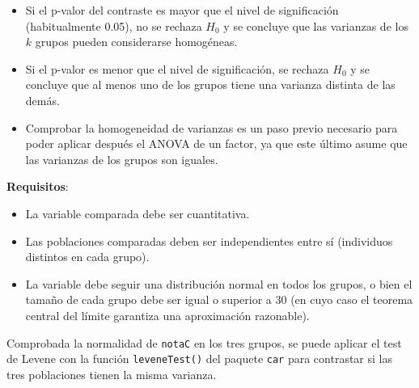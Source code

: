 \documentclass[
  spanish,
  a4paper,
]{scrreport}
\providecommand{\tightlist}{%
  \setlength{\itemsep}{0pt}\setlength{\parskip}{0pt}}
\theoremstyle{definition}
\theoremstyle{definition}
\theoremstyle{remark}
\begin{document}
\begin{tcolorbox}[enhanced jigsaw, arc=.35mm, bottomrule=.15mm, bottomtitle=1mm, breakable, colback=white, colbacktitle=quarto-callout-note-color!10!white, colframe=quarto-callout-note-color-frame, coltitle=black, left=2mm, leftrule=.75mm, opacityback=0, opacitybacktitle=0.6, rightrule=.15mm, title=\textcolor{quarto-callout-note-color}{\faInfo}\hspace{0.5em}{Interpretación}, titlerule=0mm, toprule=.15mm, toptitle=1mm]

\begin{itemize}
\tightlist
\item
  Si el p-valor del contraste es mayor que el nivel de significación
  (habitualmente 0.05), no se rechaza \(H_0\) y se concluye que las
  varianzas de los \(k\) grupos pueden considerarse homogéneas.
\item
  Si el p-valor es menor que el nivel de significación, se rechaza
  \(H_0\) y se concluye que al menos uno de los grupos tiene una
  varianza distinta de las demás.
\item
  Comprobar la homogeneidad de varianzas es un paso previo necesario
  para poder aplicar después el ANOVA de un factor, ya que este último
  asume que las varianzas de los grupos son iguales.
\end{itemize}

\end{tcolorbox}

\textbf{Requisitos}:

\begin{itemize}
\tightlist
\item
  La variable comparada debe ser cuantitativa.
\item
  Las poblaciones comparadas deben ser independientes entre sí
  (individuos distintos en cada grupo).
\item
  La variable debe seguir una distribución normal en todos los grupos, o
  bien el tamaño de cada grupo debe ser igual o superior a 30 (en cuyo
  caso el teorema central del límite garantiza una aproximación
  razonable).
\end{itemize}

Comprobada la normalidad de \texttt{notaC} en los tres grupos, se puede
aplicar el test de Levene con la función \texttt{leveneTest()} del
paquete \texttt{car} para contrastar si las tres poblaciones tienen la
misma varianza.
\end{document}
